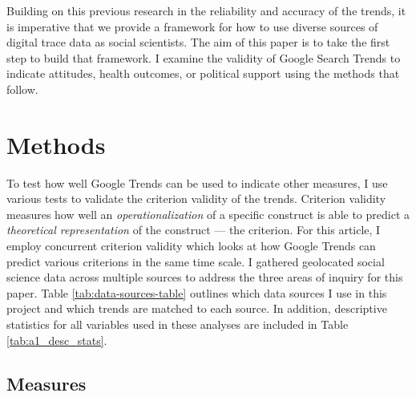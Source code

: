 Building on this previous research in the reliability and accuracy of the
trends, it is imperative that we provide a framework for how to use diverse
sources of digital trace data as social scientists. The aim of this paper is to
take the first step to build that framework. I examine the validity of Google
Search Trends to indicate attitudes, health outcomes, or political support using
the methods that follow.

\section{Methods}

To test how well Google Trends can be used to indicate other measures, I use
various tests to validate the criterion validity of the trends. Criterion
validity measures how well an \textit{operationalization} of a specific
construct is able to predict a \textit{theoretical representation} of the construct —
the criterion. For this article, I employ concurrent criterion validity which
looks at how Google Trends can predict various criterions in the same time
scale. I gathered geolocated social science data across multiple sources to
address the three areas of inquiry for this paper.  Table
\ref{tab:data-sources-table} outlines which data sources I use in this project
and which trends are matched to each source. In addition, descriptive statistics
for all variables used in these analyses are included in Table \ref{tab:a1_desc_stats}.




\subsection{Measures}

